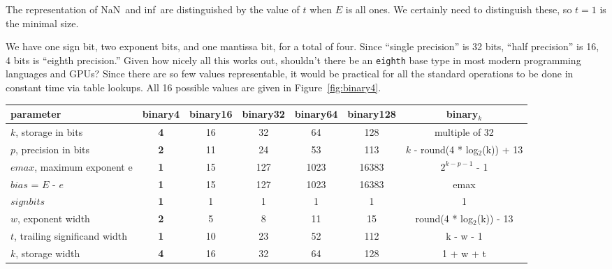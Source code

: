\documentclass[twocolumn]{article}
\newcommand\nan{\textsf{NaN}}
\renewcommand\inf{\textsf{inf}}
\begin{document}
The representation of \nan\ and \inf\ are distinguished by the value
of $t$ when $E$ is all ones. We certainly need to distinguish these,
so $t = 1$ is the minimal size.

We have one sign bit, two exponent bits, and one mantissa bit, for a
total of four. Since ``single precision'' is 32 bits, ``half
precision'' is 16, 4 bits is ``eighth precision.'' Given how nicely
all this works out, shouldn't there be an {\tt eighth} base type in
most modern programming languages and GPUs? Since there are so few
values representable, it would be practical for all the standard
operations to be done in constant time via table lookups. All 16
possible values are given in Figure~\ref{fig:binary4}.


\begin{figure*}[tp]
\begin{tabular}{|l|c|c|c|c|c|c|}
  \hline
  parameter & {\bf binary4} & binary16 & binary32 & binary64 & binary128 & binary$_k$ \\
  \hline
  $k$, storage in bits & {\bf 4} & 16 & 32 & 64 & 128 & multiple of 32 \\
  $p$, precision in bits & {\bf 2} & 11 & 24 & 53 & 113 & $k$ - round(4 * log$_2$(k)) + 13 \\
  $emax$, maximum exponent e & {\bf 1} & 15 & 127 & 1023 & 16383 & $2^{k-p-1}$ - 1 \\
  $bias$ = $E$ - $e$ & {\bf 1} & 15 & 127 & 1023 & 16383 & emax \\
  $sign bits$ & {\bf 1} & 1 & 1 & 1 & 1 & 1 \\
  $w$, exponent width & {\bf 2} & 5 & 8 & 11 & 15 & round(4 * log$_2$(k)) - 13 \\
  $t$, trailing significand width & {\bf 1} & 10 & 23 & 52 & 112 & k - w - 1 \\
  $k$, storage width & {\bf 4} & 16 & 32 & 64 & 128 & 1 + w + t \\
\hline
\end{tabular}
\caption{Parameters for the newly-introduced {\bf binary4} encoding
  for IEEE-754, compared to the standard widths (see Table~3.5 in the
  standard\cite{ieee754}). } \label{fig:binary4}
\end{figure*}

\end{document}
